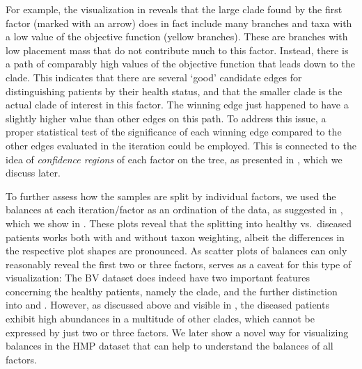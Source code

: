 For example, the visualization in  reveals
that the large clade found by the first factor (marked with an arrow) does in fact include many branches and taxa
with a low value of the objective function (yellow branches).
These are branches with low placement mass that do not contribute much to this factor.
Instead, there is a path of comparably high values of the objective function
that leads down to the  clade.
This indicates that there are several `good' candidate edges for distinguishing patients by their health status,
and that the smaller  clade is the actual clade of interest in this factor.
The winning edge just happened to have a slightly higher value than other edges on this path.
To address this issue, a proper statistical test of the significance of each winning edge
compared to the other edges evaluated in the iteration could be employed.
This is connected to the idea of \emph{confidence regions} of each factor on the tree,
as presented in \cite{Washburne2019}, which we discuss later.

To further assess how the samples are split by individual factors,
we used the balances at each iteration/factor as an ordination of the data, as suggested in \cite{Washburne2017a},
which we show in .
These plots reveal that the splitting into healthy vs.~diseased patients works both with and without taxon weighting,
albeit the differences in the respective plot shapes are pronounced.
As scatter plots of balances can only reasonably reveal the first two or three factors,
 serves as a caveat for this type of visualization:
The \ac{BV} dataset does indeed have two important features concerning the healthy patients,
namely the  clade, and the further distinction
into  and .
However, as discussed above and visible in ,
the diseased patients exhibit high abundances in a multitude of other clades,
which cannot be expressed by just two or three factors.
We later show a novel way for visualizing balances in the \ac{HMP} dataset
that can help to understand the balances of all factors.


